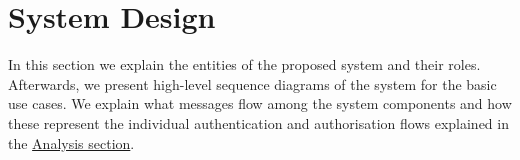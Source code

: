\section{System Design}

In this section we explain the entities of the proposed system and their roles. Afterwards, we present high-level sequence diagrams of the system for the basic use cases. We explain what messages flow among the system components and how these represent the individual authentication and authorisation flows explained in the \href{sec:analysis}{Analysis section}. 




